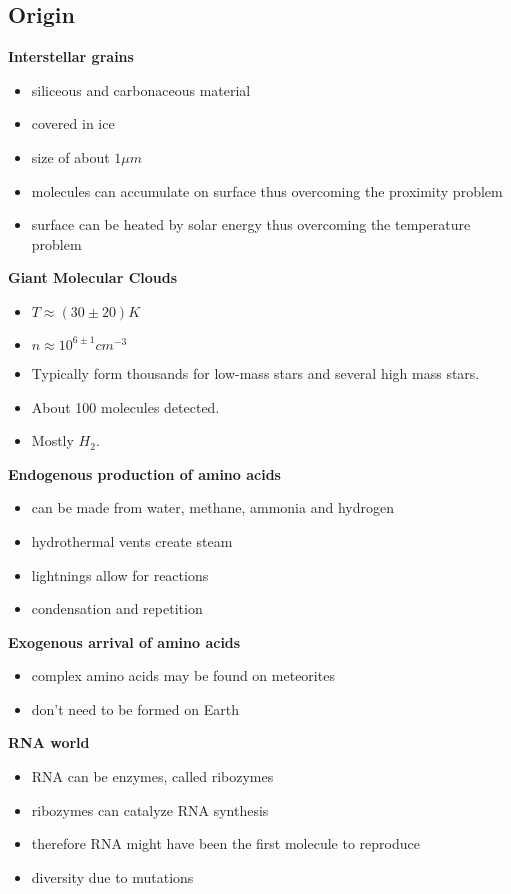\documentclass{article}
\theoremstyle{sltheorem}
\begin{document}
\subsection{Origin}
\textbf{Interstellar grains}
\begin{itemize}
	\item siliceous and carbonaceous material
	\item covered in ice
	\item size of about $1\mu m$
	\item molecules can accumulate on surface thus overcoming the proximity problem
	\item surface can be heated by solar energy thus overcoming the temperature problem
\end{itemize}
\textbf{Giant Molecular Clouds}
\begin{itemize}
	\item $T\approx (30\pm20)K$
	\item $n\approx 10^{6\pm1}cm^{-3}$
	\item Typically form thousands for low-mass stars and several high mass stars.
	\item About 100 molecules detected.
	\item Mostly $H_2$.
\end{itemize}
\textbf{Endogenous production of amino acids}
\begin{itemize}
	\item can be made from water, methane, ammonia and hydrogen
	\item hydrothermal vents create steam
	\item lightnings allow for reactions
	\item condensation and repetition
\end{itemize}
\textbf{Exogenous arrival of amino acids}
\begin{itemize}
	\item complex amino acids may be found on meteorites
	\item don't need to be formed on Earth
\end{itemize}
\textbf{RNA world}
\begin{itemize}
	\item RNA can be enzymes, called ribozymes
	\item ribozymes can catalyze RNA synthesis
	\item therefore RNA might have been the first molecule to reproduce
	\item diversity due to mutations
\end{itemize}
\end{document}
